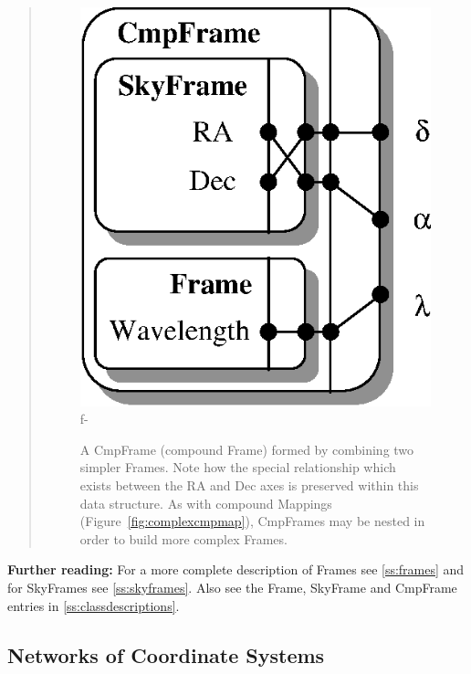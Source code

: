 \documentclass[twoside,11pt]{article}
\newcommand{\appref}[1]{Appendix~\ref{#1}}
\newcommand{\secref}[1]{\S\ref{#1}}
\renewcommand{\appref}[1]{\ref{#1}}
\renewcommand{\secref}[1]{\ref{#1}}
\begin{document}
\begin{htmlonly}
\begin{quote}
\begin{figure}
   \includegraphics[scale=1.5]{sun210_figures/cmpframe.eps}
f-
   \caption{A CmpFrame (compound Frame) formed by combining two simpler
   Frames. Note how the special relationship which exists between the RA
   and Dec axes is preserved within this data structure. As with compound
   Mappings (Figure~\ref{fig:complexcmpmap}), CmpFrames may be nested in
   order to build more complex Frames.}
   \end{figure}
   \end{quote}
\end{htmlonly}

{\bf{Further reading:}} For a more complete description of Frames see
\secref{ss:frames} and for SkyFrames see \secref{ss:skyframes}.  Also
see the Frame, SkyFrame and CmpFrame entries in
\appref{ss:classdescriptions}.

\subsection{Networks of Coordinate Systems}
\end{document}
